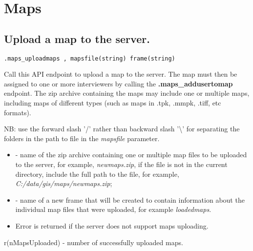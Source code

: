 \section{Maps}


\subsection{Upload a map to the server.}
\begin{lstlisting}[style=CommandLineStyle]
.maps_uploadmaps , mapsfile(string) frame(string)
\end{lstlisting}

Call this API endpoint to upload a map to the server. The map must then be
assigned to one or more interviewers by calling the \textbf{.maps\_addusertomap}
endpoint. The zip archive containing the maps may include one or multiple maps,
including maps of different types (such as maps in .tpk, .mmpk, .tiff, etc formats).

NB: use the forward slash '\slash' rather than backward slash '\textbackslash' for
separating the folders in the path to file in the \textit{mapsfile} parameter.

\paramsheader
\begin{itemize}
  \item {} - name of the zip archive containing one or multiple
        map files to be uploaded to the server, for example, \textquotedbl
        \textit{newmaps.zip}\textquotedbl, if the file is not in the current
        directory, include the full path to the file, for example, \textquotedbl
        \textit{C:/data/gis/maps/newmaps.zip}\textquotedbl;
  \item {} - name of a new frame that will be created to contain
        information about the individual map files that were uploaded, for
        example \textquotedbl \textit{loadedmaps}\textquotedbl.
\end{itemize}

\errheader
\begin{itemize}
    \item Error  is returned if the server does not support
    maps uploading.
\end{itemize}

\savedres
\begin{compactitem}
    \item r(nMapsUploaded) - number of successfully uploaded maps.
\end{compactitem}



